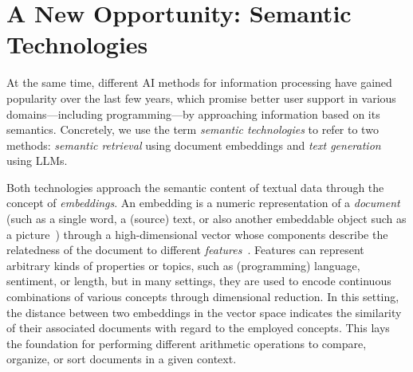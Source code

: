 
\section{A New Opportunity: Semantic Technologies}
\label{sec:background/semtec}

At the same time, different AI methods for information processing have gained popularity over the last few years, which promise better user support in various domains---including programming---by approaching information based on its semantics.
Concretely, we use the term \emph{semantic technologies} to refer to two methods: \emph{semantic retrieval} using document embeddings and \emph{text generation} using LLMs.

Both technologies approach the semantic content of textual data through the concept of \emph{embeddings}.
An embedding is a numeric representation of a \emph{document} (such as a single word, a (source) text, or also another embeddable object such as a picture~\cite{dosovitskiy2021image}) through a high-dimensional vector whose components describe the relatedness of the document to different \emph{features}~\cite{mikolov2013efficient,devlin2019bert}.
Features can represent arbitrary kinds of properties or topics, such as (programming) language, sentiment, or length, but in many settings, they are used to encode continuous combinations of various concepts through dimensional reduction.
In this setting, the distance between two embeddings in the vector space indicates the similarity of their associated documents with regard to the employed concepts.
This lays the foundation for performing different arithmetic operations to compare, organize, or sort documents in a given context.

